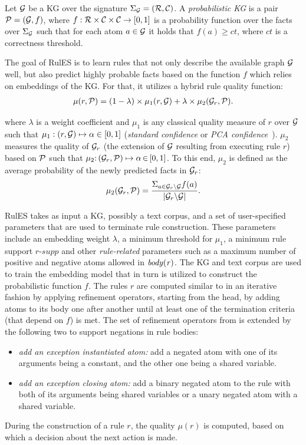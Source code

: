 Let  $\mathcal{G}$ be a KG over the signature $\Sigma_{\mathcal{G}}=(\mathcal{R},\mathcal{C})$.
A \emph{probabilistic KG} is a pair $\mathcal{P} = (\mathcal{G},f)$, 
where $f:\mathcal{R}\times \mathcal{C} \times \mathcal{C}\rightarrow [0,1]$ is a probability function over the facts over $\Sigma_{\mathcal{G}}$ such that for each atom $a \in \mathcal{G} $ it holds that $f(a) \geq ct $, where $ct$ is a correctness threshold.

The goal of RulES is to learn rules that not only describe the available graph $\mathcal{G}$ well, but also predict highly probable facts based on the function $f$ which relies on embeddings of the KG. For that, it utilizes a hybrid rule quality function:
\begin{align*}
	\mu(r,\mathcal{P})= (1 - \lambda)\times \mu_1(r,\mathcal{G}) + \lambda \times \mu_2(\mathcal{G}_r,\mathcal{P}).
\end{align*}

\noindent where $\lambda$ is a weight coefficient and $\mu_1$ is any classical quality measure of $r$ over $\mathcal{G}$ such that $\mu_1: (r,\mathcal{G}) \mapsto \alpha \in  [0,1]$ (\eg \textit{standard confidence} or \textit{PCA confidence}~\cite{amie}). 
$\mu_2$ measures the quality of $\mathcal{G}_r$ (\ie the extension of $\mathcal{G}$ resulting from executing rule $r$) based on $\mathcal{P}$ such that
 $\mu_2{:}\, (\mathcal{G}_r,\mathcal{P}) \mapsto  \alpha \,{\in}\, [0,1]$. To this end, $\mu_2$ is defined as the average probability of the newly predicted facts in $\mathcal{G}_r$: %
\begin{align*}
	\mu_2(\mathcal{G}_r,\mathcal{P}) = \dfrac{\Sigma_{a\in \mathcal{G}_r\backslash \mathcal{G}} f(a)}{|\mathcal{G}_r \backslash \mathcal{G}|}.
\end{align*}



RulES takes as input a KG, possibly a text corpus, and a set of user-specified parameters that are used to terminate rule construction.
These parameters include an embedding weight $\lambda$, 
a minimum threshold 
for $\mu_1$,  
a minimum rule support $\textit{r-supp}$ 
and other \emph{rule-related} parameters such as a maximum number of positive %
and negative 
atoms allowed in $\mathit{body(r)}$.
The KG and text corpus are used to train the embedding model that in turn is utilized to construct the probabilistic function $f$.
The rules $r$ are computed similar to \cite{amie} in an iterative fashion by applying refinement operators, starting from the head, by adding atoms to its body one after another until at least one of the termination criteria (that depend on $f$) is met. The set of refinement operators from \cite{amie} is extended by the following two to support negations in rule bodies:
\begin{itemize}
\item \emph{add an exception instantiated atom:} add a negated atom with one of its arguments
being a constant, and the other one being a shared variable.
\item \emph{add an exception closing atom:} add a binary negated atom to the rule with both of its
arguments being shared variables or a unary negated atom with a shared variable.
\end{itemize}
 During the construction of a rule $r$, the quality $\mu(r)$ is computed, based on which a decision about the next action is made.


